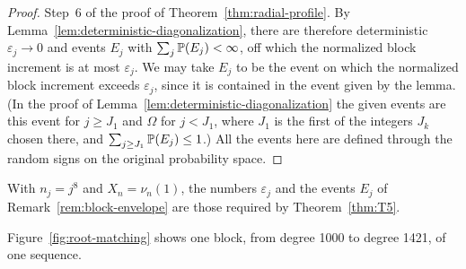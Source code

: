 \begin{proof}
Step~6 of the proof of Theorem~\ref{thm:radial-profile}.
By Lemma~\ref{lem:deterministic-diagonalization}, there are therefore
deterministic $\varepsilon_j\to0$ and events $E_j$ with
$\sum_j\mathbb P(E_j)<\infty$, off which the normalized block increment is at
most $\varepsilon_j$. We may take $E_j$ to be the event on which the
normalized block increment exceeds $\varepsilon_j$, since it is contained
in the event given by the lemma. (In the proof of
Lemma~\ref{lem:deterministic-diagonalization} the given events are this
event for $j\ge J_1$ and $\Omega$ for $j<J_1$, where $J_1$ is the first of
the integers $J_k$ chosen there, and $\sum_{j\ge J_1}\mathbb P(E_j)\le1$.)
All the events here are defined through the random signs on
the original probability space.
\end{proof}

With $n_j=j^8$ and $X_n=\nu_n(1)$, the numbers $\varepsilon_j$ and the
events $E_j$ of Remark~\ref{rem:block-envelope} are those required by
Theorem~\ref{thm:T5}.

Figure~\ref{fig:root-matching} shows one block, from degree 1000 to
degree 1421, of one sequence.


